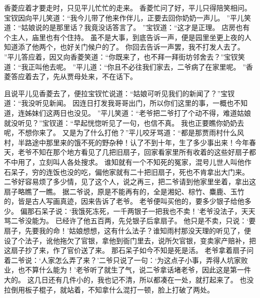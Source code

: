 香菱应着才要走时，只见平儿忙忙的走来。
香菱忙问了好，平儿只得陪笑相问。
宝钗因向平儿笑道：“我今儿带了他来作伴儿，正要去回你奶奶一声儿。
”平儿笑道：“姑娘说的是那里话？我竟没话答言了。
”宝钗道：“这才是正理。
店房也有个主人，庙里也有个住持。
虽不是大事，到底告诉一声，便是园里坐更上夜的人知道添了他两个，也好关门候户的了。
你回去告诉一声罢，我不打发人去了。
”平儿答应着，因又向香菱笑道：“你既来了，也不拜一拜街坊邻舍去？”宝钗笑道：“我正叫他去呢。
”平儿道：“你且不必往我们家去，二爷病了在家里呢。
”香菱答应着去了，先从贾母处来，不在话下。
\par
且说平儿见香菱去了，便拉宝钗忙说道：“姑娘可听见我们的新闻了？”宝钗道：“我没听见新闻。
因连日打发我哥哥出门，所以你们这里的事，一概也不知道，连姊妹们这两日也没见。
”平儿笑道：“老爷把二爷打了个动不得，难道姑娘就没听见？”宝钗道：“早起恍惚听见了一句，也信不真。
我也正要瞧你奶奶去呢，不想你来了。
又是为了什么打他？”平儿咬牙骂道：“都是那贾雨村什么风村，半路途中那里来的饿不死的野杂种！认了不到十年，生了多少事出来！今年春天，老爷不知在那个地方看见了几把旧扇子，回家看家里所有收着的这些好扇子都不中用了，立刻叫人各处搜求。
谁知就有一个不知死的冤家，混号儿世人叫他作石呆子，穷的连饭也没的吃，偏他家就有二十把旧扇子，死也不肯拿出大门来。
二爷好容易烦了多少情，见了这个人，说之再三，把二爷请到他家里坐着，拿出这扇子略瞧了一瞧。
据二爷说，原是不能再有的，全是湘妃、棕竹、麋鹿、玉竹的，皆是古人写画真迹，因来告诉了老爷。
老爷便叫买他的，要多少银子给他多少。
偏那石呆子说：‘我饿死冻死，一千两银子一把我也不卖！’老爷没法子，天天骂二爷没能为。
已经许了他五百两，先兑银子后拿扇子。
他只是不卖，只说：‘要扇子，先要我的命！’姑娘想想，这有什么法子？谁知雨村那没天理的听见了，便设了个法子，讹他拖欠了官银，拿他到衙门里去，说所欠官银，变卖家产赔补，把这扇子抄了来，作了官价送了来。
那石呆子如今不知是死是活。
老爷拿着扇子问着二爷说：‘人家怎么弄了来？’二爷只说了一句：‘为这点子小事，弄得人坑家败业，也不算什么能为！’老爷听了就生了气，说二爷拿话堵老爷，因此这是第一件大的。
这几日还有几件小的，我也记不清，所以都凑在一处，就打起来了。
也没拉倒用板子棍子，就站着，不知拿什么混打一顿，脸上打破了两处。
